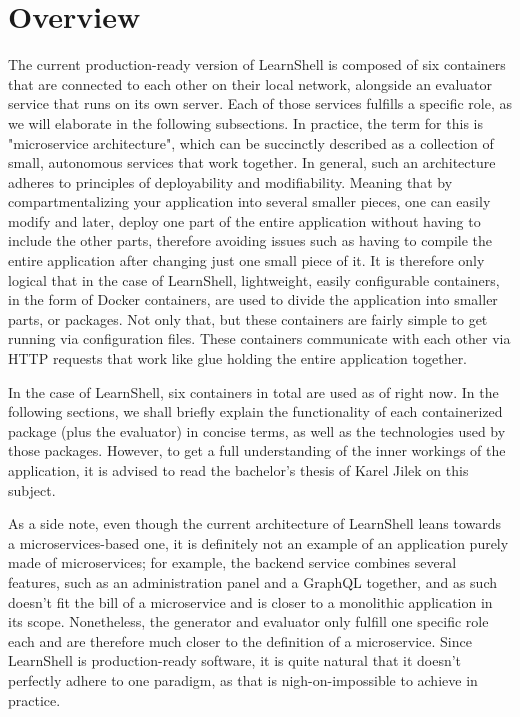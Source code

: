 \documentclass[thesis=B,english]{FITthesis}[2019/12/23]
\begin{document}
\section{Overview}

The current production-ready version of LearnShell is composed of six containers that are connected to each other on their local network, alongside an evaluator service that runs on its own server. Each of those services fulfills a specific role, as we will elaborate in the following subsections. In practice, the term for this is "microservice architecture", which can be succinctly described as a collection of small, autonomous services that work together. \cite{building-microservices} 
\newline
In general, such an architecture adheres to principles of deployability and modifiability. \cite{building-microservices,architecting-chen} Meaning that by compartmentalizing your application into several smaller pieces, one can easily modify and later, deploy one part of the entire application without having to include the other parts, therefore avoiding issues such as having to compile the entire application after changing just one small piece of it. It is therefore only logical that in the case of LearnShell, lightweight, easily configurable containers, in the form of Docker containers, are used to divide the application into smaller parts, or packages. Not only that, but these containers are fairly simple to get running via configuration files. These containers communicate with each other via HTTP requests that work like glue holding the entire application together. \cite{microservices}

In the case of LearnShell, six containers in total are used as of right now. In the following sections, we shall briefly explain the functionality of each containerized package (plus the evaluator) in concise terms, as well as the technologies used by those packages. However, to get a full understanding of the inner workings of the application, it is advised to read the bachelor's thesis of Karel Jilek on this subject.

As a side note, even though the current architecture of LearnShell leans towards a microservices-based one, it is definitely not an example of an application purely made of microservices; for example, the backend service combines several features, such as an administration panel and a GraphQL together, and as such doesn't fit the bill of a microservice and is closer to a monolithic application in its scope. Nonetheless, the generator and evaluator only fulfill one specific role each and are therefore much closer to the definition of a microservice. Since LearnShell is production-ready software, it is quite natural that it doesn't perfectly adhere to one paradigm, as that is nigh-on-impossible to achieve in practice.
\end{document}
